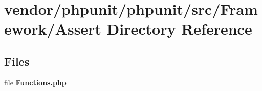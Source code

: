 \section{vendor/phpunit/phpunit/src/\+Framework/\+Assert Directory Reference}
\label{dir_4f547f022b277075872642aeade34576}
\subsection*{Files}
\begin{DoxyCompactItemize}
\item 
file {\bf Functions.\+php}
\end{DoxyCompactItemize}
